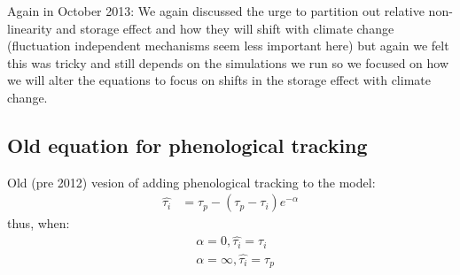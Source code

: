 \documentclass[11pt,a4paper,oneside]{article}
\begin{document}
Again in October 2013: We again discussed the urge to partition out relative non-linearity and storage effect and how they will shift with climate change (fluctuation independent mechanisms seem less important here) but again we felt this was tricky and still depends on the simulations we run so we focused on how we will alter the equations to focus on shifts in the storage effect with climate change.

\subsection{Old equation for phenological tracking}
\noindent Old (pre 2012) vesion of adding phenological tracking to the model:
\begin{align*}
\hat{\tau_{i}} & = \tau_{p}-(\tau_{p}-\tau_{i})e^{-\alpha}
\end{align*}
\noindent thus, when:
\begin{align*}
& \alpha=0, \hat{\tau_{i}}=\tau_{i}
\\
& \alpha=\infty, \hat{\tau_{i}}=\tau_{p}
\end{align*}
\end{document}
